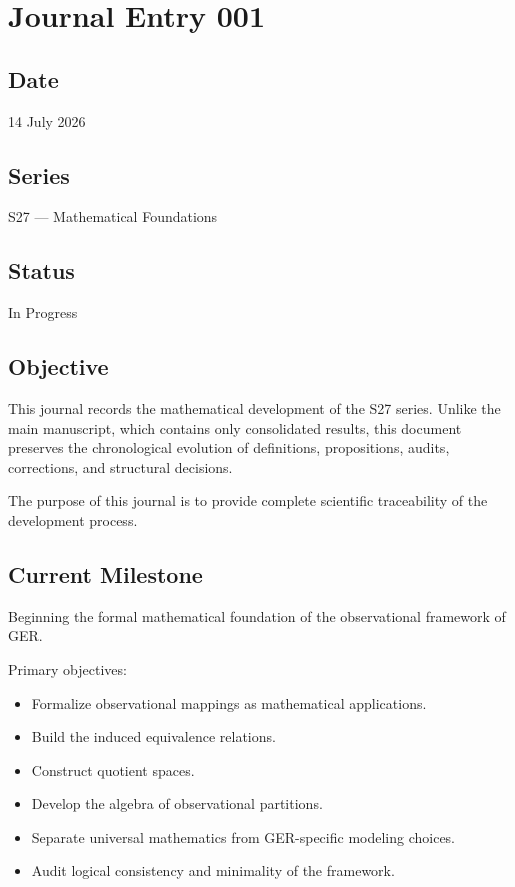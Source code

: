 
\section{Journal Entry 001}
\label{sec:journal001}

\subsection*{Date}
14 July 2026

\subsection*{Series}
S27 --- Mathematical Foundations

\subsection*{Status}
In Progress

\subsection*{Objective}

This journal records the mathematical development of the S27 series.
Unlike the main manuscript, which contains only consolidated results, this document preserves the chronological evolution of definitions, propositions, audits, corrections, and structural decisions.

The purpose of this journal is to provide complete scientific traceability of the development process.

\subsection*{Current Milestone}

Beginning the formal mathematical foundation of the observational framework of GER.

Primary objectives:

\begin{itemize}
    \item Formalize observational mappings as mathematical applications.
    \item Build the induced equivalence relations.
    \item Construct quotient spaces.
    \item Develop the algebra of observational partitions.
    \item Separate universal mathematics from GER-specific modeling choices.
    \item Audit logical consistency and minimality of the framework.
\end{itemize}

